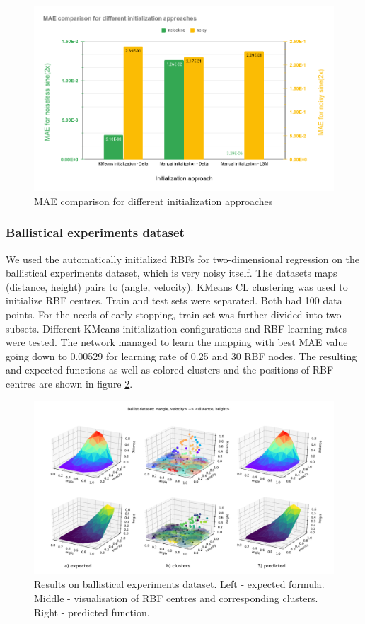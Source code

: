 \documentclass[a4paper]{article}
\begin{document}
\begin{figure}[h!]
    \centering
    \includegraphics[width=0.8\linewidth]{img/3-3_sine_moj_3.png}
    \caption{MAE comparison for different initialization approaches}
    \label{fig:3-3_sine_moj}
\end{figure}

\subsubsection{Ballistical experiments dataset}

We used the automatically initialized RBFs for two-dimensional regression on the ballistical experiments dataset, which is very noisy itself. The datasets maps (distance, height) pairs to (angle, velocity). KMeans CL clustering was used to initialize RBF centres. Train and test sets were separated. Both had 100 data points. For the needs of early stopping, train set was further divided into two subsets. Different KMeans initialization configurations and RBF learning rates were tested. The network managed to learn the mapping with best MAE value going down to 0.00529 for learning rate of 0.25 and 30 RBF nodes. The resulting and expected functions as well as colored clusters and the positions of RBF centres are shown in figure \ref{fig:3-3_ballistic}. 

\begin{figure}[h!]
    \centering
    \includegraphics[width=\linewidth]{img/3-3_ballist.png}
    \caption{Results on ballistical experiments dataset. Left - expected formula. Middle - visualisation of RBF centres and corresponding clusters. Right - predicted function.}
    \label{fig:3-3_ballistic}
\end{figure}
\end{document}
